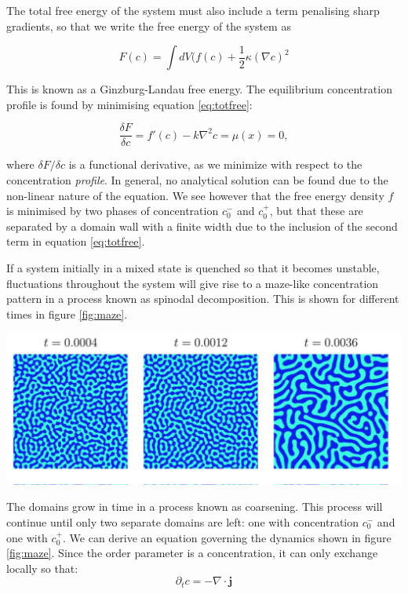 \documentclass{Dissertate}
\let\origfigure\figure
\let\endorigfigure\endfigure
\renewenvironment{figure}[1][2] {
    \expandafter\origfigure\expandafter[H]
} {
    \endorigfigure
}
\begin{document}
The total free energy of the system must also include a term penalising sharp gradients, so that we write the free energy of the system as 

\begin{equation}
	\label{eq:totfree}
	F(c) = \int dV (f(c)+\frac{1}{2}\kappa (\nabla c)^2
\end{equation}

This is known as a Ginzburg-Landau free energy. The equilibrium concentration profile is found by minimising equation \ref{eq:totfree}:

\begin{equation}
\frac{\delta F}{\delta c} = f'(c)-k\nabla^2c=\mu(x) =0,
\label{eq:euler}\end{equation}

where \(\delta F/\delta c\) is a functional derivative, as we minimize
with respect to the concentration \emph{profile}. In general, no analytical solution can be found due to the non-linear nature of the equation. We see however that the free energy density $f$ is minimised by two phases of concentration $c_0^-$ and $c_0^+$, but that these are separated by a domain wall with a finite width due to the inclusion of the second term in equation \ref{eq:totfree}.

If a system initially in a mixed state is quenched so that it becomes unstable, fluctuations throughout the system will give rise to a maze-like concentration pattern in a process known as spinodal decomposition. This is shown for different times in figure \ref{fig:maze}.

\begin{figure}
\hypertarget{fig:maze}{%
\centering
\includegraphics{source/figures/png/CahnHilliard.png}
\caption{Cahn hilliard domains}\label{fig:maze}
}
\end{figure}

The domains grow in time in a process known as coarsening. This process will continue until only two separate domains are left: one with concentration $c_0^-$ and one with $c_0^+$. We can derive an equation governing the dynamics shown in figure \ref{fig:maze}. Since the order parameter is a concentration, it can only exchange locally so that: 
\[
\partial_t c = -\nabla \cdot \mathbf{j}
\]
\end{document}
